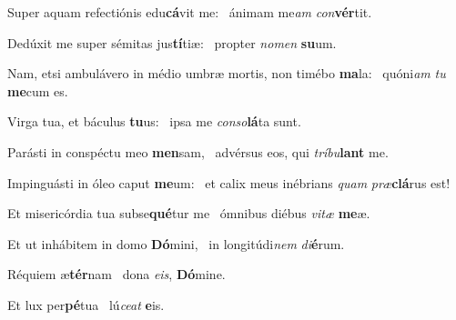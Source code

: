 \item Super aquam refectiónis edu\textbf{cá}vit me:~\psstar{} ánimam me\textit{am} \textit{con}\textbf{vér}tit.

\item Dedúxit me super sémitas jus\textbf{tí}tiæ:~\psstar{} propter \textit{no}\textit{men} \textbf{su}um.

\item Nam, etsi ambulávero in médio umbræ mortis, non timébo \textbf{ma}la:~\psstar{} quóni\textit{am} \textit{tu} \textbf{me}cum es.

\item Virga tua, et báculus \textbf{tu}us:~\psstar{} ipsa me \textit{con}\textit{so}\textbf{lá}ta sunt.

\item Parásti in conspéctu meo \textbf{men}sam,~\psstar{} advérsus eos, qui \textit{trí}\textit{bu}\textbf{lant} me.

\item Impinguásti in óleo caput \textbf{me}um:~\psstar{} et calix meus inébrians \textit{quam} \textit{præ}\textbf{clá}rus est!

\item Et misericórdia tua subse\textbf{qué}tur me~\psstar{} ómnibus diébus \textit{vi}\textit{tæ} \textbf{me}æ.

\item Et ut inhábitem in domo \textbf{Dó}mini,~\psstar{} in longitúdi\textit{nem} \textit{di}\textbf{é}rum.

\item Réquiem æ\textbf{tér}nam~\psstar{} dona \textit{e}\textit{is}, \textbf{Dó}mine.

\item Et lux per\textbf{pé}tua~\psstar{} lú\textit{ce}\textit{at} \textbf{e}is.
